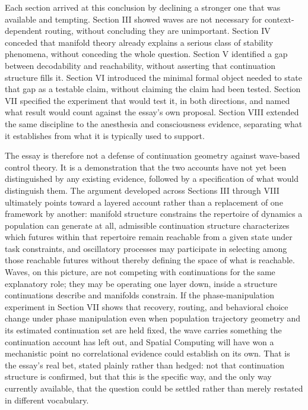 \documentclass[11pt]{article}
\begin{document}
Each section arrived at this conclusion by declining a stronger one that was available and tempting. Section III showed waves are not necessary for context-dependent routing, without concluding they are unimportant. Section IV conceded that manifold theory already explains a serious class of stability phenomena, without conceding the whole question. Section V identified a gap between decodability and reachability, without asserting that continuation structure fills it. Section VI introduced the minimal formal object needed to state that gap as a testable claim, without claiming the claim had been tested. Section VII specified the experiment that would test it, in both directions, and named what result would count against the essay's own proposal. Section VIII extended the same discipline to the anesthesia and consciousness evidence, separating what it establishes from what it is typically used to support.

The essay is therefore not a defense of continuation geometry against wave-based control theory. It is a demonstration that the two accounts have not yet been distinguished by any existing evidence, followed by a specification of what would distinguish them. The argument developed across Sections III through VIII ultimately points toward a layered account rather than a replacement of one framework by another: manifold structure constrains the repertoire of dynamics a population can generate at all, admissible continuation structure characterizes which futures within that repertoire remain reachable from a given state under task constraints, and oscillatory processes may participate in selecting among those reachable futures without thereby defining the space of what is reachable. Waves, on this picture, are not competing with continuations for the same explanatory role; they may be operating one layer down, inside a structure continuations describe and manifolds constrain. If the phase-manipulation experiment in Section VII shows that recovery, routing, and behavioral choice change under phase manipulation even when population trajectory geometry and its estimated continuation set are held fixed, the wave carries something the continuation account has left out, and Spatial Computing will have won a mechanistic point no correlational evidence could establish on its own. That is the essay's real bet, stated plainly rather than hedged: not that continuation structure is confirmed, but that this is the specific way, and the only way currently available, that the question could be settled rather than merely restated in different vocabulary.
\end{document}
